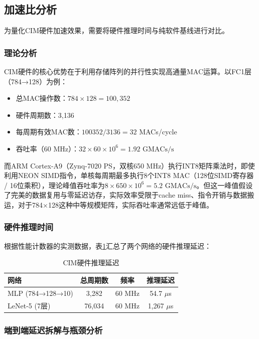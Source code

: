 \documentclass[12pt, a4paper]{article}
\begin{document}
\subsection{加速比分析}

为量化CIM硬件加速效果，需要将硬件推理时间与纯软件基线进行对比。

\subsubsection{理论分析}

CIM硬件的核心优势在于利用存储阵列的并行性实现高通量MAC运算。以FC1层（784→128）为例：

\begin{itemize}
	\item 总MAC操作数：$784 \times 128 = 100,352$
	\item 硬件周期数：3,136
	\item 每周期有效MAC数：$100352 / 3136 = 32$ MACs/cycle
	\item 吞吐率（60 MHz）：$32 \times 60 \times 10^6 = 1.92 \text{ GMACs/s}$
\end{itemize}

而ARM Cortex-A9（Zynq-7020 PS，双核650 MHz）执行INT8矩阵乘法时，即使利用NEON SIMD指令，单核每周期最多执行8个INT8 MAC（128位SIMD寄存器 / 16位乘积），理论峰值吞吐率为$8 \times 650 \times 10^6 = 5.2 \text{ GMACs/s}$。但这一峰值假设了完美的数据复用与零延迟访存，实际效率受限于cache miss、指令开销与数据搬运，对于784×128这种中等规模矩阵，实际吞吐率通常远低于峰值。

\subsubsection{硬件推理时间}

根据性能计数器的实测数据，表\ref{tab:hw_latency}汇总了两个网络的硬件推理延迟：

\begin{table}[H]
	\centering
	\caption{CIM硬件推理延迟}
	\begin{tabular}{lccc}
		\toprule
		网络 & 总周期数 & 频率 & 推理延迟 \\
		\midrule
		MLP (784→128→10) & 3,282 & 60 MHz & 54.7 $\mu$s \\
		LeNet-5 (7层) & 76,034 & 60 MHz & 1,267 $\mu$s \\
		\bottomrule
	\end{tabular}
	\label{tab:hw_latency}
\end{table}

\subsubsection{端到端延迟拆解与瓶颈分析}
\label{sec:profiler}
\end{document}
